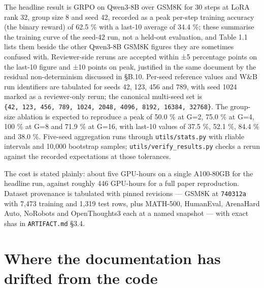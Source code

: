 \documentclass[12pt,a4paper]{report}
\begin{document}
The headline result is GRPO on Qwen3-8B over GSM8K for 30 steps at LoRA
rank 32, group size 8 and seed 42, recorded as a peak per-step training
accuracy (the binary reward) of 62.5 \% with a last-10 average of 34.4
\%; these summarise the training curve of the seed-42 run, not a
held-out evaluation, and Table 1.1 lists them beside the other Qwen3-8B
GSM8K figures they are sometimes confused with. Reviewer-side reruns are
accepted within ±5 percentage points on the last-10 figure and ±10
points on peak, justified in the same document by the residual
non-determinism discussed in §B.10. Per-seed reference values and W\&B
run identifiers are tabulated for seeds 42, 123, 456 and 789, with seed
1024 marked as a reviewer-only rerun; the canonical multi-seed set is
\texttt{\{42,\ 123,\ 456,\ 789,\ 1024,\ 2048,\ 4096,\ 8192,\ 16384,\ 32768\}}.
The group-size ablation is expected to reproduce a peak of 50.0 \% at
G=2, 75.0 \% at G=4, 100 \% at G=8 and 71.9 \% at G=16, with last-10
values of 37.5 \%, 52.1 \%, 84.4 \% and 38.0 \%. Five-seed aggregation
runs through \texttt{utils/stats.py} with rliable intervals and 10,000
bootstrap samples; \texttt{utils/verify\_results.py} checks a rerun
against the recorded expectations at those tolerances.

The cost is stated plainly: about five GPU-hours on a single A100-80GB
for the headline run, against roughly 446 GPU-hours for a full paper
reproduction. Dataset provenance is tabulated with pinned revisions ---
GSM8K at \texttt{740312a} with 7,473 training and 1,319 test rows, plus
MATH-500, HumanEval, ArenaHard Auto, NoRobots and OpenThoughts3 each at
a named snapshot --- with exact shas in \texttt{ARTIFACT.md} §3.4.

\section{Where the documentation has drifted from the
code}\label{where-the-documentation-has-drifted-from-the-code}
\end{document}
